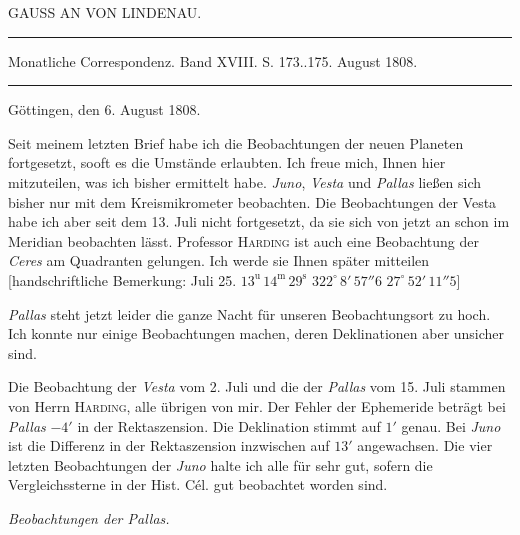 \clearpage
{}
\begin{center}
GAUSS AN VON LINDENAU.
\end{center}

\hrule
\begin{center}
\fontsize{10}{12}\selectfont Monatliche Correspondenz. Band XVIII. S. 173..175. August 1808.
\end{center}
\hrule

\begin{flushright}
Göttingen, den 6. August 1808.
\end{flushright}

\par\indent Seit meinem letzten Brief habe ich die Beobachtungen der neuen Planeten fortgesetzt, sooft es die Umstände erlaubten. Ich freue mich, Ihnen hier mitzuteilen, was ich bisher ermittelt habe. \emph{Juno}, \emph{Vesta} und \emph{Pallas} ließen sich bisher nur mit dem Kreismikrometer beobachten. Die Beobachtungen der Vesta habe ich aber seit dem 13. Juli nicht fortgesetzt, da sie sich von jetzt an schon im Meridian beobachten lässt. Professor \textsc{Harding} ist auch eine Beobachtung der \emph{Ceres} am Quadranten gelungen. Ich werde sie Ihnen später mitteilen [handschriftliche Bemerkung: Juli 25. $13^{\text{u}}\,14^{\text{m}}\,29^{\text{s}}$ \quad $322^\circ\,8'\,57''6$ \quad $27^\circ\,52'\,11''5$]

\par\indent \emph{Pallas} steht jetzt leider die ganze Nacht für unseren Beobachtungsort zu hoch. Ich konnte nur einige Beobachtungen machen, deren Deklinationen aber unsicher sind.

\par\indent Die Beobachtung der \emph{Vesta} vom 2. Juli und die der \emph{Pallas} vom 15. Juli stammen von Herrn \textsc{Harding}, alle übrigen von mir. Der Fehler der Ephemeride beträgt bei \emph{Pallas} $-4'$ in der Rektaszension. Die Deklination stimmt auf $1'$ genau. Bei \emph{Juno} ist die Differenz in der Rektaszension inzwischen auf $13'$ angewachsen. Die vier letzten Beobachtungen der \emph{Juno} halte ich alle für sehr gut, sofern die Vergleichssterne in der Hist. Cél. gut beobachtet worden sind.

\begin{center}
\emph{Beobachtungen der Pallas.}
\end{center}


